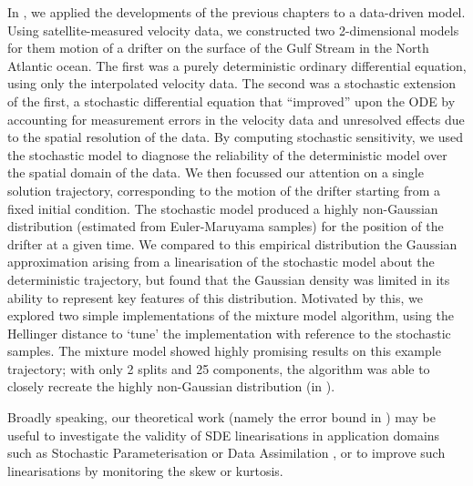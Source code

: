 In , we applied the developments of the previous chapters to a data-driven model.
Using satellite-measured velocity data, we constructed two 2-dimensional models for them motion of a drifter on the surface of the Gulf Stream in the North Atlantic ocean.
The first was a purely deterministic ordinary differential equation, using only the interpolated velocity data.
The second was a stochastic extension of the first, a stochastic differential equation that ``improved'' upon the ODE by accounting for measurement errors in the velocity data and unresolved effects due to the spatial resolution of the data.
By computing stochastic sensitivity, we used the stochastic model to diagnose the reliability of the deterministic model over the spatial domain of the data.
We then focussed our attention on a single solution trajectory, corresponding to the motion of the drifter starting from a fixed initial condition.
The stochastic model produced a highly non-Gaussian distribution (estimated from Euler-Maruyama samples) for the position of the drifter at a given time.
We compared to this empirical distribution the Gaussian approximation arising from a linearisation of the stochastic model about the deterministic trajectory, but found that the Gaussian density was limited in its ability to represent key features of this distribution.
Motivated by this, we explored two simple implementations of the mixture model algorithm, using the Hellinger distance to `tune' the implementation with reference to the stochastic samples.
The mixture model showed highly promising results on this example trajectory; with only 2 splits and 25 components, the algorithm was able to closely recreate the highly non-Gaussian distribution (in ).

Broadly speaking, our theoretical work (namely the error bound in ) may be useful to investigate the validity of SDE linearisations in application domains such as Stochastic Parameterisation \citep{BernerEtAl_2017_StochasticParameterizationNew,Palmer_2019_StochasticWeatherClimate,LeutbecherEtAl_2017_StochasticRepresentationsModel} or Data Assimilation \citep{BudhirajaEtAl_2019_AssimilatingDataModels,ReichCotter_2015_ProbabilisticForecastingBayesian,LawEtAl_2015_DataAssimilationMathematical}, or to improve such linearisations by monitoring the skew or kurtosis.



